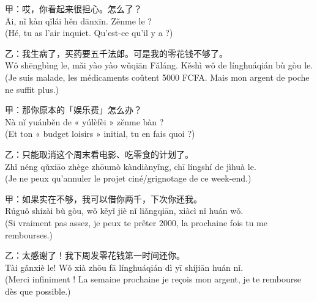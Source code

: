 \documentclass[11pt]{article}
\begin{document}
\begin{textebox}
甲：哎，你看起来很担心。怎么了？\\
Āi, nǐ kàn qǐlái hěn dānxīn. Zěnme le ?\\
(Hé, tu as l'air inquiet. Qu'est-ce qu'il y a ?)

乙：我生病了，买药要五千法郎。可是我的零花钱不够了。\\
Wǒ shēngbìng le, mǎi yào yào wǔqiān Fǎláng. Kěshì wǒ de línghuáqián bù gòu le.\\
(Je suis malade, les médicaments coûtent 5000 FCFA. Mais mon argent de poche ne suffit plus.)

甲：那你原本的「娱乐费」怎么办？\\
Nà nǐ yuánběn de « yúlèfèi » zěnme bàn ?\\
(Et ton « budget loisirs » initial, tu en fais quoi ?)

乙：只能取消这个周末看电影、吃零食的计划了。\\
Zhǐ néng qǔxiāo zhège zhōumò kàndiànyǐng, chī língshí de jìhuà le.\\
(Je ne peux qu'annuler le projet ciné/grignotage de ce week-end.)

甲：如果实在不够，我可以借你两千，下次你还我。\\
Rúguǒ shízài bù gòu, wǒ kěyǐ jiè nǐ liǎngqiān, xiàcì nǐ huán wǒ.\\
(Si vraiment pas assez, je peux te prêter 2000, la prochaine fois tu me rembourses.)

乙：太感谢了！我下周发零花钱第一时间还你。\\
Tài gǎnxiè le! Wǒ xià zhōu fā línghuáqián dì yī shíjiān huán nǐ.\\
(Merci infiniment ! La semaine prochaine je reçois mon argent, je te rembourse dès que possible.)
\end{textebox}
\end{document}
